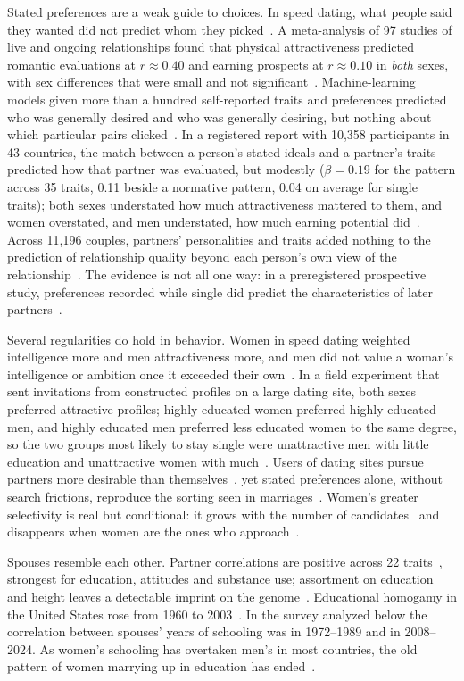 Stated preferences are a weak guide to choices. In speed dating, what people said they wanted did not predict whom they
picked~\cite{todd2007}. A meta-analysis of 97 studies of live and ongoing relationships found that physical attractiveness
predicted romantic evaluations at $r\approx0.40$ and earning prospects at $r\approx0.10$ in \emph{both} sexes, with sex
differences that were small and not significant~\cite{eastwick2014}. Machine-learning models given more than a hundred
self-reported traits and preferences predicted who was generally desired and who was generally desiring, but nothing about
which particular pairs clicked~\cite{joel2017}. In a registered report with 10,358 participants in 43 countries, the match
between a person's stated ideals and a partner's traits predicted how that partner was evaluated, but modestly
($\beta=0.19$ for the pattern across 35 traits, 0.11 beside a normative pattern, 0.04 on average for single traits); both
sexes understated how much attractiveness mattered to them, and women overstated, and men understated, how much earning
potential did~\cite{eastwick2025}. Across 11,196 couples, partners' personalities and traits added nothing to the
prediction of relationship quality beyond each person's own view of the relationship~\cite{joel2020}. The evidence is not
all one way: in a preregistered prospective study, preferences recorded while single did predict the characteristics of later
partners~\cite{gerlach2019}.

Several regularities do hold in behavior. Women in speed dating weighted intelligence more and men attractiveness more, and
men did not value a woman's intelligence or ambition once it exceeded their own~\cite{fisman2006}. In a field experiment that
sent invitations from constructed profiles on a large dating site, both sexes preferred attractive profiles; highly
educated women preferred highly educated men, and highly educated men preferred less educated women to the same degree,
so the two groups most likely to stay single were unattractive men with little education and unattractive women with
much~\cite{egebark2021}. Users of dating sites pursue partners more desirable than themselves~\cite{bruch2018}, yet stated
preferences alone, without search frictions, reproduce the sorting seen in marriages~\cite{hitsch2010}. Women's greater
selectivity is real but conditional: it grows with the number of candidates~\cite{fisman2006} and disappears when women are the
ones who approach~\cite{finkel2009}.

Spouses resemble each other. Partner correlations are positive across 22 traits~\cite{horwitz2023}, strongest for
education, attitudes and substance use; assortment on education and height leaves a detectable imprint on the
genome~\cite{yengo2018,robinson2017}. Educational homogamy in the United States rose from 1960 to 2003~\cite{schwartz2005}. In the
survey analyzed below the correlation between spouses' years of schooling was \GssHomOld{} in 1972--1989 and \GssHomNew{} in
2008--2024. As women's schooling has overtaken men's in most countries, the old pattern of women marrying
up in education has ended~\cite{esteve2016}.

